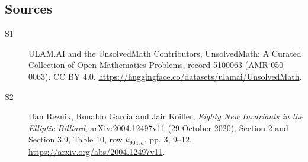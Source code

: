 \documentclass[11pt]{article}
\begin{document}
\subsection{Sources}
\begin{description}
\item[\hypertarget{source:5100063:1}{S1}] ULAM.AI and the UnsolvedMath Contributors, UnsolvedMath: A Curated Collection of Open Mathematics Problems, record 5100063 (AMR-050-0063). CC BY 4.0. \url{https://huggingface.co/datasets/ulamai/UnsolvedMath}.
\item[\hypertarget{source:5100063:2}{S2}] Dan Reznik, Ronaldo Garcia and Jair Koiller, \emph{Eighty New Invariants in the Elliptic Billiard}, arXiv:2004.12497v11 (29 October 2020), Section 2 and Section 3.9, Table 10, row $k_{904,a}$, pp. 3, 9--12. \url{https://arxiv.org/abs/2004.12497v11}.
\end{description}
\label{end:5100063}
\end{document}
